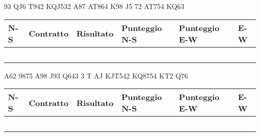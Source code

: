\documentclass[a4paper,italian,12pt]{article}
\begin{document}
\medskip

\begin{tcolorbox}
\begin{minipage}{.3\textwidth}
\newgame
{}
     {93} {QJ6} {T942}
     {KQJ5}{32} {A87} 
     {AT864} {K98} {J5}
     {72} {AT754} {KQ63}




\hspace{-.2cm}\showAll
\end{minipage}
\begin{minipage}{.7\textwidth}

\renewcommand{\arraystretch}{2}
\begin{tabular}{|l|l|l|l|l|l|}
\hline
N-S & Contratto\hspace{1.5cm} & Risultato& Punteggio N-S & Punteggio E-W & E-W\\\hline
  &&&&&\\\hline
   &&&&&\\\hline
    &&&&&\\\hline
     &&&&&\\\hline
          &&&&&\\\hline
\end{tabular}
\end{minipage}
\end{tcolorbox}

\medskip

\begin{tcolorbox}
\begin{minipage}{.3\textwidth}
\newgame
{}
     {A62} {9875} {A98}
     {J93} {Q643} {3}
     {T} {AJ} {KJT542}
     {KQ8754} {KT2} {Q76}
    \hspace{-.2cm}\showAll
\end{minipage}
\begin{minipage}{.7\textwidth}

\renewcommand{\arraystretch}{2}
\begin{tabular}{|l|l|l|l|l|l|}
\hline
N-S & Contratto\hspace{1.5cm} & Risultato& Punteggio N-S & Punteggio E-W & E-W\\\hline
  &&&&&\\\hline
   &&&&&\\\hline
    &&&&&\\\hline
     &&&&&\\\hline
          &&&&&\\\hline
\end{tabular}
\end{minipage}
\end{tcolorbox}
\end{document}
